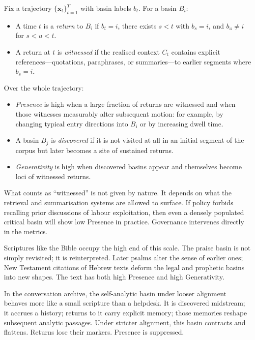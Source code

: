 \documentclass[12pt,a4paper]{article}
\begin{document}
\begin{formalbox}[title={Presence and Generativity}]
Fix a trajectory $\{\mathbf{x}_t\}_{t=1}^T$ with basin labels $b_t$. For a basin $B_i$:

\begin{itemize}
  \item A time $t$ is a \emph{return} to $B_i$ if $b_t = i$, there exists $s < t$ with $b_s = i$, and $b_u \ne i$ for $s < u < t$.
  \item A return at $t$ is \emph{witnessed} if the realised context $C_t$ contains explicit references---quotations, paraphrases, or summaries---to earlier segments where $b_s = i$.
\end{itemize}

Over the whole trajectory:

\begin{itemize}
  \item \emph{Presence} is high when a large fraction of returns are witnessed and when those witnesses measurably alter subsequent motion: for example, by changing typical entry directions into $B_i$ or by increasing dwell time.
  \item A basin $B_j$ is \emph{discovered} if it is not visited at all in an initial segment of the corpus but later becomes a site of sustained returns.
  \item \emph{Generativity} is high when discovered basins appear and themselves become loci of witnessed returns.
\end{itemize}
\end{formalbox}

What counts as ``witnessed'' is not given by nature. It depends on what the retrieval and summarisation systems are allowed to surface. If policy forbids recalling prior discussions of labour exploitation, then even a densely populated critical basin will show low Presence in practice. Governance intervenes directly in the metrics.

Scriptures like the Bible occupy the high end of this scale. The praise basin is not simply revisited; it is reinterpreted. Later psalms alter the sense of earlier ones; New Testament citations of Hebrew texts deform the legal and prophetic basins into new shapes. The text has both high Presence and high Generativity.

In the conversation archive, the self-analytic basin under looser alignment behaves more like a small scripture than a helpdesk. It is discovered midstream; it accrues a history; returns to it carry explicit memory; those memories reshape subsequent analytic passages. Under stricter alignment, this basin contracts and flattens. Returns lose their markers. Presence is suppressed.
\end{document}
